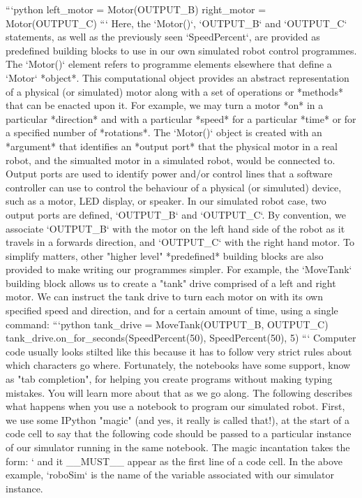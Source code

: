 \documentclass[letterpaper,10pt,english]{sphinxmanual}
\begin{document}
{```python
left_motor = Motor(OUTPUT_B)
right_motor = Motor(OUTPUT_C)
```
Here, the `Motor()`, `OUTPUT_B` and `OUTPUT_C` statements, as well as the previously seen `SpeedPercent`, are provided as predefined building blocks to use in our own simulated robot control programmes.
The `Motor()` element refers to programme elements elsewhere that define a `Motor` *object*. This computational object provides an abstract representation of a physical (or simulated) motor along with a set of operations or *methods* that can be enacted upon it. For example, we may turn a motor *on* in a particular *direction* and with a particular *speed* for a particular *time* or for a specified number of *rotations*.
The `Motor()` object is created with an *argument* that identifies an *output port* that the physical motor in a real robot, and the simualted motor in a simulated robot, would be connected to. Output ports are used to identify power and/or control lines that a software controller can use to control the behaviour of a physical (or simuluted) device, such as a motor, LED display, or speaker. In our simulated robot case, two output ports are defined, `OUTPUT_B` and `OUTPUT_C`. By convention, we associate `OUTPUT_B` with the motor on the left hand side of the robot as it travels in a forwards direction, and `OUTPUT_C` with the right hand motor.
To simplify matters, other "higher level" *predefined* building blocks are also provided to make writing our programmes simpler.
For example, the `MoveTank` building block allows us to create a "tank" drive comprised of a left and right motor. We can instruct the tank drive to turn each motor on with its own specified speed and direction, and for a certain amount of time, using a single command:
```python
tank_drive = MoveTank(OUTPUT_B, OUTPUT_C)
tank_drive.on_for_seconds(SpeedPercent(50), SpeedPercent(50), 5)
```
Computer code usually looks stilted like this because it has to follow very strict rules about which characters go where. Fortunately, the notebooks have some support, know as "tab completion", for helping you create programs without making typing mistakes. You will learn more about that as we go along.
The following describes what happens when you use a notebook to program our simulated robot.
First, we use some IPython "magic" (and yes, it really is called that!), at the start of a code cell to say that the following code should be passed to a particular instance of our simulator running in the same notebook.
The magic incantation takes the form:
`%
and it __MUST__ appear as the first line of a code cell. In the above example, `roboSim` is the name of the variable associated with our simulator instance.
}
\end{document}
